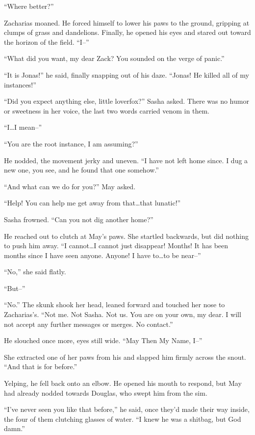 ``Where better?''

Zacharias moaned. He forced himself to lower his paws to the ground, gripping at clumps of grass and dandelions. Finally, he opened his eyes and stared out toward the horizon of the field. ``I--''

``What did you want, my dear Zack? You sounded on the verge of panic.''

``It is Jonas!'' he said, finally snapping out of his daze. ``Jonas! He killed all of my instances!''

``Did you expect anything else, little loverfox?'' Sasha asked. There was no humor or sweetness in her voice, the last two words carried venom in them.

``I\ldots I mean--''

``You are the root instance, I am assuming?''

He nodded, the movement jerky and uneven. ``I have not left home since. I dug a new one, you see, and he found that one somehow.''

``And what can we do for you?'' May asked.

``Help! You can help me get away from that\ldots that lunatic!''

Sasha frowned. ``Can you not dig another home?''

He reached out to clutch at May's paws. She startled backwards, but did nothing to push him away. ``I cannot\ldots I cannot just disappear! Months! It has been months since I have seen anyone. Anyone! I have to\ldots to be near--''

``No,'' she said flatly.

``But--''

``No.'' The skunk shook her head, leaned forward and touched her nose to Zacharias's. ``Not me. Not Sasha. Not us. You are on your own, my dear. I will not accept any further messages or merges. No contact.''

He slouched once more, eyes still wide. ``May Then My Name, I--''

She extracted one of her paws from his and slapped him firmly across the snout. ``And that is for before.''

Yelping, he fell back onto an elbow. He opened his mouth to respond, but May had already nodded towards Douglas, who swept him from the sim.

``I've never seen you like that before,'' he said, once they'd made their way inside, the four of them clutching glasses of water. ``I knew he was a shitbag, but God damn.''

